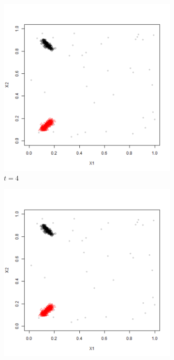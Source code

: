 \begin{figure}[!htb]
        \begin{subfigure}[t]{0.25\textwidth}
                \includegraphics[page=5,width=\textwidth]{figures/datasets/Benchmark1_5500}
                \caption{$t = 4$}
                \label{Fig:Benchmark1_13}
        \end{subfigure}%
		\qquad %
        \begin{subfigure}[t]{0.25\textwidth}
                \includegraphics[page=6,width=\textwidth]{figures/datasets/Benchmark1_5500}

\end{subfigure}
\end{figure}
